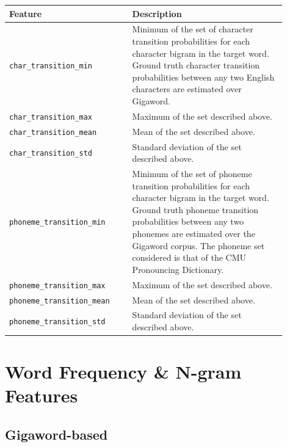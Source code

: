 \documentclass{dcthesis}
\theoremstyle{definition}
\theoremstyle{remark}
\begin{document}
\begin{table}[H]
  \centering
  \begin{tabular}{>{\centering\arraybackslash}p{0.4\linewidth}>{\arraybackslash}p{0.5\linewidth}}
    \textbf{Feature} & \textbf{Description} \\ \hline
    \texttt{char\_transition\_min} & Minimum of the set of character transition probabilities for each character bigram in the target word. Ground truth character transition probabilities between any two English characters are estimated over Gigaword.\\
    \hline 
    \texttt{char\_transition\_max} & Maximum of the set described above.\\
    \hline 
    \texttt{char\_transition\_mean} & Mean of the set described above.\\
    \hline 
    \texttt{char\_transition\_std} & Standard deviation of the set described above.\\
    \hline 
    \texttt{phoneme\_transition\_min} & Minimum of the set of phoneme transition probabilities for each character bigram in the target word. Ground truth phoneme transition probabilities between any two phonemes are estimated over the Gigaword corpus. The phoneme set considered is that of the CMU Pronouncing Dictionary.\tablefootnote{\url{http://speech.cs.cmu.edu/cgi-bin/cmudict}}\\
    \hline 
    \texttt{phoneme\_transition\_max} & Maximum of the set described above.\\
    \hline 
    \texttt{phoneme\_transition\_mean} & Mean of the set described above.\\
    \hline 
    \texttt{phoneme\_transition\_std} & Standard deviation of the set described above.\\
  \end{tabular}
  \label{phonetic_features}
\end{table}

\section{Word Frequency \& N-gram Features}

\subsection{Gigaword-based}
\end{document}
